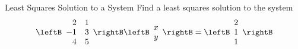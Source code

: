 \begin{example}{Least Squares Solution to a System}
Find a least squares solution to the system 
\begin{equation*}
\leftB
\begin{array}{rr}
2 & 1 \\ 
-1 & 3 \\ 
4 & 5
\end{array}
\rightB \leftB 
\begin{array}{c}
x \\ 
y
\end{array}
\rightB =\leftB 
\begin{array}{c}
2 \\ 
1 \\ 
1
\end{array}
\rightB
\end{equation*}
\end{example}

